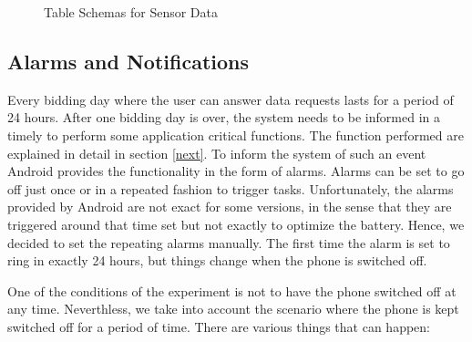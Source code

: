 \begin{figure}[htp]
\hspace{1em}
%
\caption{Table Schemas for Sensor Data}
\label{fig:ts22}
\end{figure}


\subsection{Alarms and Notifications}

Every bidding day where the user can answer data requests lasts for a period of 24 hours. After one bidding day is over, the system needs to be informed in a timely to perform some application critical functions. The function performed are explained in detail in section \ref{next}. 
To inform the system of such an event Android provides the functionality in the form of alarms. Alarms can be set to go off just once or in a repeated fashion to trigger tasks. Unfortunately, the alarms provided by Android are not exact for some versions, in the sense that they are triggered around that time set but not exactly to optimize the battery. Hence, we decided to set the repeating alarms manually. The first time the alarm is set to ring in exactly 24 hours, but things change when the phone is switched off.


One of the conditions of the experiment is not to have the phone switched off at any time. Neverthless, we take into account the scenario where
the phone is kept switched off for a period of time. There are various things that can happen:

